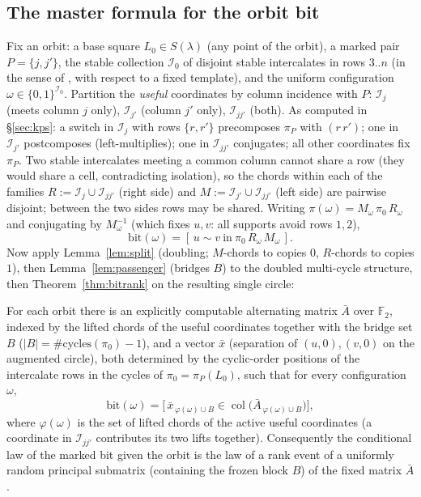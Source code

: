 \subsection{The master formula for the orbit bit}

Fix an orbit: a base square $L_0\in S(\lambda)$ (any point of the
orbit), a marked pair $P=\{j,j'\}$, the stable collection
$\mathcal I_0$ of disjoint stable intercalates in rows $3..n$ (in the
sense of \cite[\S7]{KPS25}, with respect to a fixed template), and the
uniform configuration $\omega\in\{0,1\}^{\mathcal I_0}$.  Partition
the \emph{useful} coordinates by column incidence with $P$:
$\mathcal I_j$ (meets column $j$ only), $\mathcal I_{j'}$ (column $j'$
only), $\mathcal I_{jj'}$ (both).  As computed in \S\ref{sec:kps}: a
switch in $\mathcal I_j$ with rows $\{r,r'\}$ precomposes $\pi_P$ with
$(r\,r')$; one in $\mathcal I_{j'}$ postcomposes (left-multiplies); one
in $\mathcal I_{jj'}$ conjugates; all other coordinates fix $\pi_P$.
Two stable intercalates meeting a common column cannot share a row
(they would share a cell, contradicting isolation), so the chords
within each of the families $R:=\mathcal I_j\cup\mathcal I_{jj'}$
(right side) and $M:=\mathcal I_{j'}\cup\mathcal I_{jj'}$ (left side)
are pairwise disjoint; between the two sides rows may be shared.
Writing $\pi(\omega)=M_\omega\,\pi_0\,R_\omega$ and conjugating by
$M_\omega^{-1}$ (which fixes $u,v$: all supports avoid rows $1,2$),
\[
\text{bit}(\omega)
=[\,u\sim v\ \text{in}\ \pi_0\,R_\omega\,M_\omega\,].
\]
Now apply Lemma~\ref{lem:split} (doubling; $M$-chords to copies $0$,
$R$-chords to copies $1$), then Lemma~\ref{lem:passenger} (bridges
$B$) to the doubled multi-cycle structure, then
Theorem~\ref{thm:bitrank} on the resulting single circle:

\begin{theorem}\label{thm:master}
For each orbit there is an explicitly computable alternating matrix
$\bar A$ over $\mathbb{F}_2$, indexed by the lifted chords of the
useful coordinates together with the bridge set $B$
($|B|=\#\text{cycles}(\pi_0)-1$), and a vector $\bar x$ (separation of
$(u,0),(v,0)$ on the augmented circle), both determined by the
cyclic-order positions of the intercalate rows in the cycles of
$\pi_0=\pi_P(L_0)$, such that for every configuration $\omega$,
\[
\mathrm{bit}(\omega)=
\bigl[\,\bar x_{\,\varphi(\omega)\cup B}
\in\operatorname{col}\bigl(\bar A_{\,\varphi(\omega)\cup B}\bigr)\bigr],
\]
where $\varphi(\omega)$ is the set of lifted chords of the active
useful coordinates (a coordinate in $\mathcal I_{jj'}$ contributes its
two lifts together).  Consequently the conditional law of the marked
bit given the orbit is the law of a rank event of a uniformly random
principal submatrix (containing the frozen block $B$) of the fixed
matrix $\bar A$.
\end{theorem}

